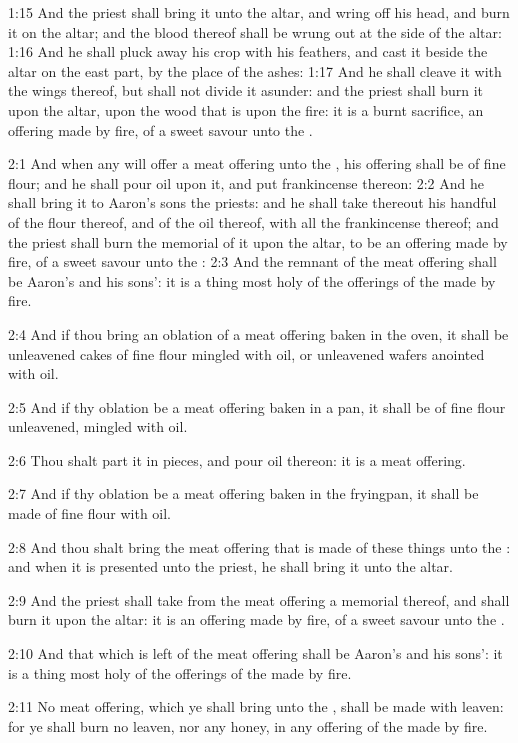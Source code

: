 1:15 And the priest shall bring it unto the altar, and wring off his head, and burn it on the altar; and the blood thereof shall be wrung out at the side of the altar: 1:16 And he shall pluck away his crop with his feathers, and cast it beside the altar on the east part, by the place of the ashes: 1:17 And he shall cleave it with the wings thereof, but shall not divide it asunder: and the priest shall burn it upon the altar, upon the wood that is upon the fire: it is a burnt sacrifice, an offering made by fire, of a sweet savour unto the \LORD.

2:1 And when any will offer a meat offering unto the \LORD, his offering shall be of fine flour; and he shall pour oil upon it, and put frankincense thereon: 2:2 And he shall bring it to Aaron's sons the priests: and he shall take thereout his handful of the flour thereof, and of the oil thereof, with all the frankincense thereof; and the priest shall burn the memorial of it upon the altar, to be an offering made by fire, of a sweet savour unto the \LORD: 2:3 And the remnant of the meat offering shall be Aaron's and his sons': it is a thing most holy of the offerings of the \LORD made by fire.

2:4 And if thou bring an oblation of a meat offering baken in the oven, it shall be unleavened cakes of fine flour mingled with oil, or unleavened wafers anointed with oil.

2:5 And if thy oblation be a meat offering baken in a pan, it shall be of fine flour unleavened, mingled with oil.

2:6 Thou shalt part it in pieces, and pour oil thereon: it is a meat offering.

2:7 And if thy oblation be a meat offering baken in the fryingpan, it shall be made of fine flour with oil.

2:8 And thou shalt bring the meat offering that is made of these things unto the \LORD: and when it is presented unto the priest, he shall bring it unto the altar.

2:9 And the priest shall take from the meat offering a memorial thereof, and shall burn it upon the altar: it is an offering made by fire, of a sweet savour unto the \LORD.

2:10 And that which is left of the meat offering shall be Aaron's and his sons': it is a thing most holy of the offerings of the \LORD made by fire.

2:11 No meat offering, which ye shall bring unto the \LORD, shall be made with leaven: for ye shall burn no leaven, nor any honey, in any offering of the \LORD made by fire.

